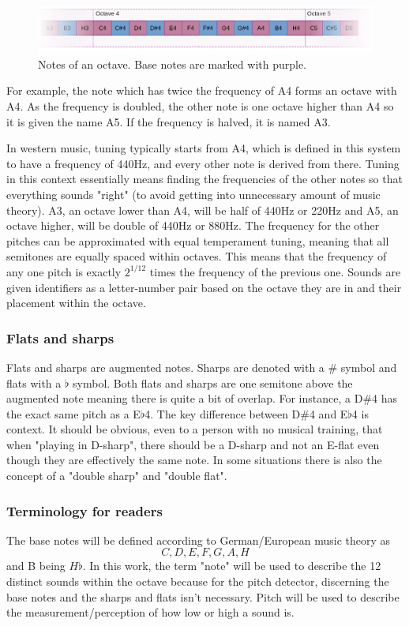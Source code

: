 \begin{figure}[ht]
    \centering
    \includegraphics[width=\textwidth]{./images/noteScale.png}
    \caption{Notes of an octave. Base notes are marked with purple. \label{fig:noteScale}}
\end{figure}

For example, the note which has twice the frequency of A4 forms an octave with A4. As the frequency is doubled, the other note is one octave higher than A4 so it is given the name A5. If the frequency is halved, it is named A3. 

In western music, tuning typically starts from A4, which is defined in this system to have a frequency of 440Hz, and every other note is derived from there. Tuning in this context essentially means finding the frequencies of the other notes so that everything sounds "right" (to avoid getting into unnecessary amount of music theory). A3, an octave lower than A4, will be half of 440Hz or 220Hz and A5, an octave higher, will be double of 440Hz or 880Hz. The frequency for the other pitches can be approximated with equal temperament tuning, meaning that all semitones are equally spaced within octaves. This means that the frequency of any one pitch is exactly $2^{1/12}$ times the frequency of the previous one. Sounds are given identifiers as a letter-number pair based on the octave they are in and their placement within the octave. 

\subsubsection{Flats and sharps}
Flats and sharps are augmented notes. Sharps are denoted with a $\#$ symbol and flats with a $\flat$ symbol. Both flats and sharps are one semitone above the augmented note meaning there is quite a bit of overlap. For instance, a D$\#$4 has the exact same pitch as a E$\flat$4. The key difference between D$\#$4 and E$\flat$4 is context. It should be obvious, even to a person with no musical training, that when "playing in D-sharp", there should be a D-sharp and not an E-flat even though they are effectively the same note. In some situations there is also the concept of a "double sharp" and "double flat".    

\subsubsection{Terminology for readers}
The base notes will be defined according to German/European music theory as \[C, D, E, F, G, A, H\] and B being $H\flat$. In this work, the term "note" will be used to describe the 12 distinct sounds within the octave because for the pitch detector, discerning the base notes and the sharps and flats isn't necessary. Pitch will be used to describe the measurement/perception of how low or high a sound is.

